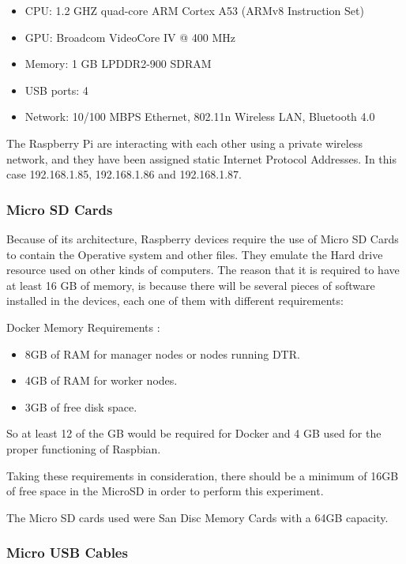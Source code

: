 \documentclass[sigconf]{acmart}
\begin{document}
	\begin{itemize}
		\item CPU: 1.2 GHZ quad-core ARM Cortex A53 (ARMv8 Instruction Set)
		\item GPU: Broadcom VideoCore IV @ 400 MHz
		\item Memory: 1 GB LPDDR2-900 SDRAM
		\item USB ports: 4
		\item Network: 10/100 MBPS Ethernet, 802.11n Wireless LAN, Bluetooth 4.0
	\end{itemize}
	\cite{hackaday2016}  
	
	The Raspberry Pi are interacting with each other using a private wireless network, and they have been assigned static Internet Protocol Addresses. In this case 192.168.1.85, 192.168.1.86 and 192.168.1.87.
	
	
	\subsubsection{Micro SD Cards}
	
	Because of its architecture, Raspberry devices require the use of Micro SD Cards to contain the Operative system and other files. They emulate the Hard drive resource used on other kinds of computers.
	The reason that it is required to have at least 16 GB of memory, is because there will be several pieces of software installed in the devices, each one of them with different requirements:
	
	Docker Memory Requirements \cite{dockerdoc2017}:

	\begin{itemize}
	\item 8GB of RAM for manager nodes or nodes running DTR.
	\item 4GB of RAM for worker nodes.
	\item 3GB of free disk space.
	\end{itemize}
	
	So at least 12 of the GB would be required for Docker and 4 GB used for the proper functioning of Raspbian. \cite{rpicards2017}
	
	Taking these requirements in consideration, there should be a minimum of 16GB of free space in the MicroSD in order to perform this experiment. 
	
	The Micro SD cards used were San Disc Memory Cards with a 64GB capacity.
	
	\subsubsection{Micro USB Cables}
	
\end{document}
